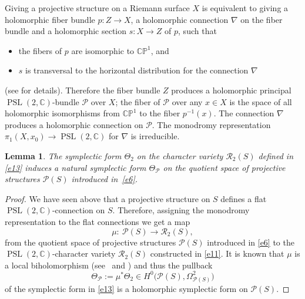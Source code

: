 \documentclass[pdftex]{sigma}
\numberwithin{equation}{section}
\newtheorem{Lemma}[Theorem]{Lemma}
\begin{document}
Giving a projective structure on a Riemann surface $X$ is equivalent to giving a
holomorphic fiber bundle $p\colon Z \longrightarrow X$, a holomorphic connection
$\nabla$ on the fiber bundle and a holomorphic section $s\colon X \longrightarrow Z$
of $p$, such that
\begin{itemize}\itemsep=0pt
\item the fibers of $p$ are isomorphic to ${\mathbb C}{\mathbb P}^1$, and

\item $s$ is transversal to the horizontal distribution for the connection $\nabla$
\end{itemize}
(see \cite{Gu,Hu} for details). Therefore the fiber bundle $Z$ produces a holomorphic principal $\operatorname{PSL}(2,
{\mathbb C})$-bundle $\mathcal P$ over $X$; the fiber of $\mathcal P$ over any $x \in X$ is the space of
all holomorphic isomorphisms from ${\mathbb C}{\mathbb P}^1$ to the fiber $p^{-1}(x)$.
The connection $\nabla$ produces a holomorphic connection on $\mathcal P$. The monodromy representation
$\pi_1(X, x_0) \longrightarrow \operatorname{PSL}(2, {\mathbb C})$ for $\nabla$ is irreducible.

\begin{Lemma}
The symplectic form $\Theta_2$ on the character variety ${\mathcal R}_2(S)$ defined in
\eqref{e13} induces a natural symplectic form $\Theta_{\mathcal P}$ on the
quotient space of projective structures ${\mathcal P}(S)$ introduced in~\eqref{e6}.
\end{Lemma}

\begin{proof}
We have seen above that a projective structure on $S$ defines a flat
$\operatorname{PSL}(2,{\mathbb C})$-connection on $S$. Therefore, assigning
the monodromy representation to the flat connections we get a map
\begin{equation}\label{e12}
\mu\colon\ {\mathcal P}(S) \longrightarrow {\mathcal R}_2(S),
\end{equation}
from the quotient space of projective structures ${\mathcal P}(S)$ introduced in \eqref{e6} to
the $\operatorname{PSL}(2,{\mathbb C})$-character variety ${\mathcal R}_2(S)$ constructed in \eqref{e11}.
It is known that $\mu$ is a local biholomorphism (see~\cite[p.~272]{Hu} and \cite{He}) and thus the
pullback
\begin{equation}\label{e16}
\Theta_{\mathcal P} := \mu^*\Theta_2 \in H^0\bigl({\mathcal P}(S), \Omega^2_{{\mathcal P}(S)}\bigr)
\end{equation}
of the symplectic form in \eqref{e13} is a holomorphic symplectic form
on ${\mathcal P}(S)$.\end{proof}
\end{document}
